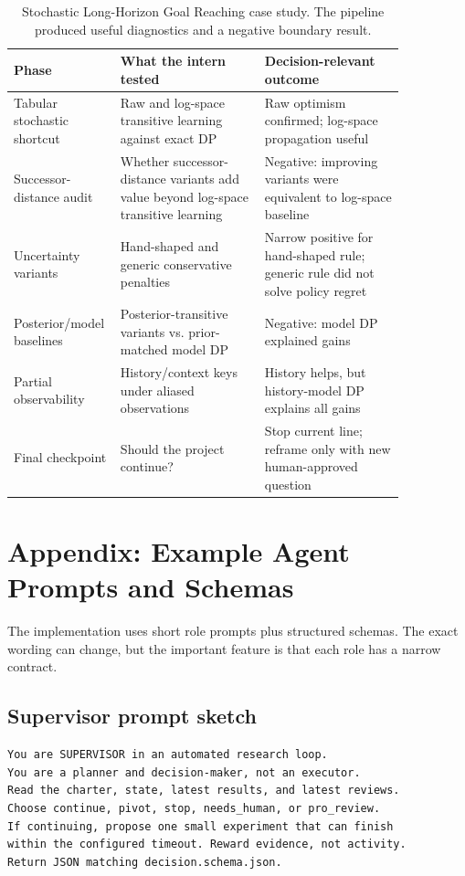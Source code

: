 \documentclass{article}
\begin{document}
\begin{table}[h]
\centering
\small
\begin{tabular}{p{0.16\linewidth}p{0.35\linewidth}p{0.34\linewidth}}
\toprule
Phase & What the intern tested & Decision-relevant outcome \\
\midrule
Tabular stochastic shortcut & Raw and log-space transitive learning against exact DP & Raw optimism confirmed; log-space propagation useful \\
Successor-distance audit & Whether successor-distance variants add value beyond log-space transitive learning & Negative: improving variants were equivalent to log-space baseline \\
Uncertainty variants & Hand-shaped and generic conservative penalties & Narrow positive for hand-shaped rule; generic rule did not solve policy regret \\
Posterior/model baselines & Posterior-transitive variants vs. prior-matched model DP & Negative: model DP explained gains \\
Partial observability & History/context keys under aliased observations & History helps, but history-model DP explains all gains \\
Final checkpoint & Should the project continue? & Stop current line; reframe only with new human-approved question \\
\bottomrule
\end{tabular}
\caption{Stochastic Long-Horizon Goal Reaching case study. The pipeline produced useful diagnostics and a negative boundary result.}
\end{table}

\section{Appendix: Example Agent Prompts and Schemas}

The implementation uses short role prompts plus structured schemas. The exact wording can change, but the important feature is that each role has a narrow contract.

\subsection{Supervisor prompt sketch}

\begin{verbatim}
You are SUPERVISOR in an automated research loop.
You are a planner and decision-maker, not an executor.
Read the charter, state, latest results, and latest reviews.
Choose continue, pivot, stop, needs_human, or pro_review.
If continuing, propose one small experiment that can finish
within the configured timeout. Reward evidence, not activity.
Return JSON matching decision.schema.json.
\end{verbatim}
\end{document}
